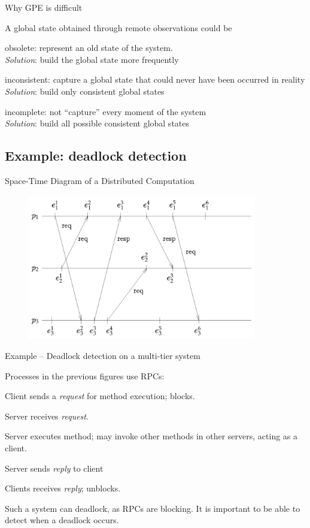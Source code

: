 \begin{frame}{Why GPE is difficult}

A global state obtained through remote observations could be
\BIL
\item \alert{obsolete}: represent an old state of the system. \\
  \emph{Solution}: build the global state more frequently
\item \alert{inconsistent}: capture a global state that could never
  have been occurred in reality\\
  \emph{Solution}: build only consistent global states
\item \alert{incomplete}: not ``capture'' every moment of the system\\
  \emph{Solution}: build all possible consistent global states
\EIL
\end{frame}

\subsection{Example: deadlock detection}

\begin{frame}{Space-Time Diagram of a Distributed Computation}

\begin{figure} 
\includegraphics[width=10cm]{figs/02/figure-1}
\end{figure}

\end{frame}

\begin{frame}{Example -- Deadlock detection on a multi-tier system}

Processes in the previous figures use RPCs:
\BI
\item Client sends a \emph{request} for method execution; blocks.
\item Server receives \emph{request}.
\item Server executes method; may invoke other methods in other
servers, acting as a client.
\item Server sends \emph{reply} to client
\item Clients receives \emph{reply}; unblocks.
\EI

\bigskip
Such a system can deadlock, as RPCs are blocking. It is important to 
be able to detect when a deadlock occurs.

\end{frame}

